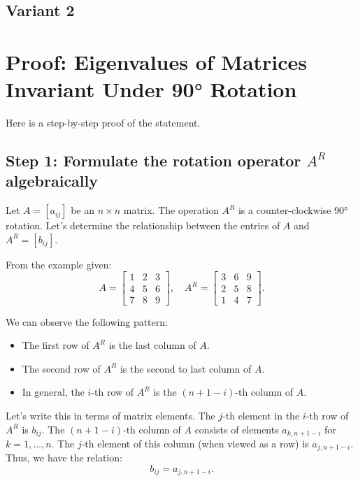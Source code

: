 \documentclass[12pt,a4paper]{article}
\theoremstyle{definition}
\begin{document}
    \subsection{Variant 2}
        \section*{Proof: Eigenvalues of Matrices Invariant Under 90° Rotation}

        Here is a step-by-step proof of the statement.

        \subsection*{Step 1: Formulate the rotation operator $A^R$ algebraically}

        Let $A = [a_{ij}]$ be an $n \times n$ matrix. The operation $A^R$ is a counter-clockwise 90° rotation. Let's determine the relationship between the entries of $A$ and $A^R = [b_{ij}]$.

        From the example given:
        \[
            A = \begin{bmatrix}
                    1 & 2 & 3 \\
                    4 & 5 & 6 \\
                    7 & 8 & 9
            \end{bmatrix}, \quad
            A^R =
            \begin{bmatrix}
                3 & 6 & 9 \\
                2 & 5 & 8 \\
                1 & 4 & 7
            \end{bmatrix}.
        \]

        We can observe the following pattern:
        \begin{itemize}
            \item The first row of $A^R$ is the last column of $A$.
            \item The second row of $A^R$ is the second to last column of $A$.
            \item In general, the $i$-th row of $A^R$ is the $(n+1-i)$-th column of $A$.
        \end{itemize}

        Let's write this in terms of matrix elements. The $j$-th element in the $i$-th row of $A^R$ is $b_{ij}$. The $(n+1-i)$-th column of $A$ consists of elements $a_{k, n+1-i}$ for $k=1, \ldots, n$. The $j$-th element of this column (when viewed as a row) is $a_{j, n+1-i}$.
        Thus, we have the relation:
        \[ b_{ij} = a_{j, n+1-i}. \]
\end{document}
